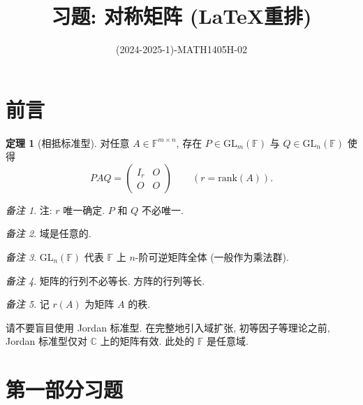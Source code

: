 \documentclass[11pt]{ctexart}
\title{习题: 对称矩阵 (\LaTeX 重排)}
\author{(2024-2025-1)-MATH1405H-02}
\theoremstyle{definition}
\numberwithin{equation}{section}
\theoremstyle{definition}
\newtheorem*{theorem}{定理}
\theoremstyle{remark}
\newtheorem*{remark}{备注}
\begin{document}
\maketitle

\vspace{5cm}

\section*{前言}

\begin{pinked}
\begin{theorem}[相抵标准型]
    对任意 $A\in \mathbb F^{m\times n}$, 存在 $P\in \mathrm{GL}_m(\mathbb F)$ 与 $Q\in \mathrm{GL}_n(\mathbb F)$ 使得 
\begin{equation}
    PAQ=\begin{pmatrix}I_r&O\\O&O\end{pmatrix}\qquad( r=\mathrm{rank}(A)).
\end{equation}
\end{theorem}
\end{pinked}

\begin{remark}
    注: $r$ 唯一确定. $P$ 和 $Q$ 不必唯一. 
\end{remark}

\begin{remark}
    域是任意的. 
\end{remark}

\begin{remark}
$\mathrm{GL}_n(\mathbb F)$ 代表 $\mathbb F$ 上 $n$-阶可逆矩阵全体 (一般作为乘法群). 
\end{remark}

\begin{remark}
    矩阵的行列不必等长. 方阵的行列等长. 
\end{remark}

\begin{remark}
    记 $r(A)$ 为矩阵 $A$ 的秩. 
\end{remark}

\begin{pinked}
    请不要盲目使用 Jordan 标准型. 在完整地引入域扩张, 初等因子等理论之前, Jordan 标准型仅对 $\mathbb C$ 上的矩阵有效. 此处的 $\mathbb F$ 是任意域. 
\end{pinked}

\newpage

\section{第一部分习题}
\end{document}
